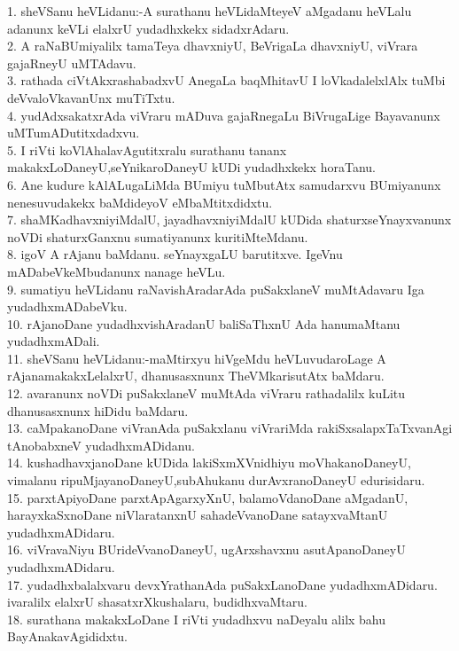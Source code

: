 \documentclass{article}
\begin{document}
1. sheVSanu heVLidanu:-A surathanu heVLidaMteyeV aMgadanu heVLalu adanunx keVLi elalxrU yudadhxkekx sidadxrAdaru.\\
2. A raNaBUmiyalilx tamaTeya dhavxniyU, BeVrigaLa dhavxniyU, viVrara gajaRneyU uMTAdavu.\\
3. rathada ciVtAkxrashabadxvU AnegaLa baqMhitavU I loVkadalelxlAlx tuMbi deVvaloVkavanUnx muTiTxtu.\\
4. yudAdxsakatxrAda viVraru mADuva gajaRnegaLu BiVrugaLige Bayavanunx uMTumADutitxdadxvu.\\
5. I riVti koVlAhalavAgutitxralu surathanu tananx makakxLoDaneyU,seYnikaroDaneyU kUDi yudadhxkekx horaTanu.\\
6. Ane kudure kAlALugaLiMda BUmiyu tuMbutAtx samudarxvu BUmiyanunx nenesuvudakekx baMdideyoV eMbaMtitxdidxtu.\\
7. shaMKadhavxniyiMdalU, jayadhavxniyiMdalU kUDida shaturxseYnayxvanunx noVDi shaturxGanxnu sumatiyanunx kuritiMteMdanu.\\
8. igoV A rAjanu baMdanu. seYnayxgaLU barutitxve. IgeVnu mADabeVkeMbudanunx nanage heVLu.\\
9. sumatiyu heVLidanu raNavishAradarAda puSakxlaneV muMtAdavaru Iga yudadhxmADabeVku.\\
10. rAjanoDane yudadhxvishAradanU baliSaThxnU Ada hanumaMtanu yudadhxmADali.\\
11. sheVSanu heVLidanu:-maMtirxyu hiVgeMdu heVLuvudaroLage A rAjanamakakxLelalxrU, dhanusasxnunx TheVMkarisutAtx baMdaru.\\
12. avaranunx noVDi puSakxlaneV muMtAda viVraru rathadalilx kuLitu dhanusasxnunx hiDidu baMdaru.\\
13. caMpakanoDane viVranAda puSakxlanu viVrariMda rakiSxsalapxTaTxvanAgi tAnobabxneV yudadhxmADidanu.\\
14. kushadhavxjanoDane kUDida lakiSxmXVnidhiyu moVhakanoDaneyU, vimalanu ripuMjayanoDaneyU,subAhukanu durAvxranoDaneyU edurisidaru.\\
15. parxtApiyoDane parxtApAgarxyXnU, balamoVdanoDane aMgadanU, harayxkaSxnoDane niVlaratanxnU sahadeVvanoDane satayxvaMtanU yudadhxmADidaru.\\
16. viVravaNiyu BUrideVvanoDaneyU, ugArxshavxnu asutApanoDaneyU yudadhxmADidaru.\\
17. yudadhxbalalxvaru devxYrathanAda puSakxLanoDane yudadhxmADidaru. ivaralilx elalxrU shasatxrXkushalaru, budidhxvaMtaru.\\
18. surathana makakxLoDane I riVti yudadhxvu naDeyalu alilx bahu BayAnakavAgididxtu.\\
\end{document}
